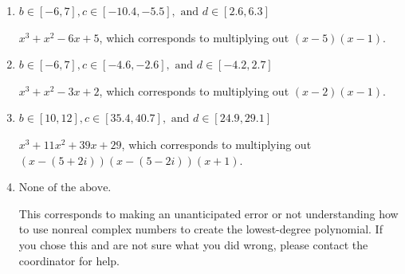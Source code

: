 \documentclass{extbook}[14pt]
\begin{document}
\begin{enumerate}
{\begin{enumerate}[label=\Alph*.]
* $x^{3} -11 x^{2} +39 x -29$, which is the correct option.
\item \( b \in [-6, 7], c \in [-10.4, -5.5], \text{ and } d \in [2.6, 6.3] \)

$x^{3} + x^{2} -6 x + 5$, which corresponds to multiplying out $(x -5)(x -1)$.
\item \( b \in [-6, 7], c \in [-4.6, -2.6], \text{ and } d \in [-4.2, 2.7] \)

$x^{3} + x^{2} -3 x + 2$, which corresponds to multiplying out $(x -2)(x -1)$.
\item \( b \in [10, 12], c \in [35.4, 40.7], \text{ and } d \in [24.9, 29.1] \)

$x^{3} +11 x^{2} +39 x + 29$, which corresponds to multiplying out $(x-(5 + 2 i))(x-(5 - 2 i))(x + 1)$.
\item \( \text{None of the above.} \)

This corresponds to making an unanticipated error or not understanding how to use nonreal complex numbers to create the lowest-degree polynomial. If you chose this and are not sure what you did wrong, please contact the coordinator for help.
\end{enumerate}

}
\end{enumerate}
\end{document}
